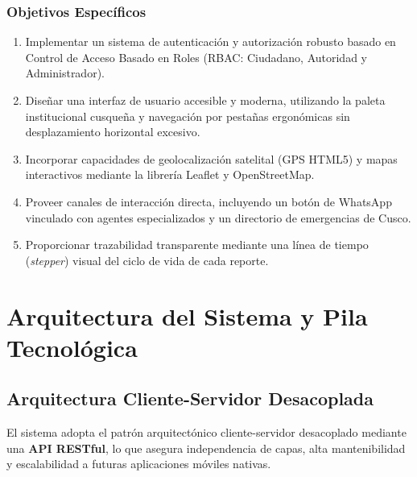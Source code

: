 \documentclass[12pt,a4paper]{article}
\begin{document}
\subsubsection{Objetivos Específicos}
\begin{enumerate}[leftmargin=*]
    \item Implementar un sistema de autenticación y autorización robusto basado en Control de Acceso Basado en Roles (RBAC: Ciudadano, Autoridad y Administrador).
    \item Diseñar una interfaz de usuario accesible y moderna, utilizando la paleta institucional cusqueña y navegación por pestañas ergonómicas sin desplazamiento horizontal excesivo.
    \item Incorporar capacidades de geolocalización satelital (GPS HTML5) y mapas interactivos mediante la librería Leaflet y OpenStreetMap.
    \item Proveer canales de interacción directa, incluyendo un botón de WhatsApp vinculado con agentes especializados y un directorio de emergencias de Cusco.
    \item Proporcionar trazabilidad transparente mediante una línea de tiempo (\textit{stepper}) visual del ciclo de vida de cada reporte.
\end{enumerate}

\section{Arquitectura del Sistema y Pila Tecnológica}

\subsection{Arquitectura Cliente-Servidor Desacoplada}
El sistema adopta el patrón arquitectónico cliente-servidor desacoplado mediante una \textbf{API RESTful}, lo que asegura independencia de capas, alta mantenibilidad y escalabilidad a futuras aplicaciones móviles nativas.
\end{document}
